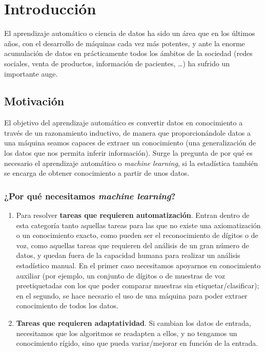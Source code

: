 \chapter{Introducción}
 El aprendizaje automático o ciencia de datos ha sido un área que en los últimos años, con el desarrollo de máquinas cada vez
 más potentes, y ante la enorme acumulación de datos en prácticamente todos los ámbitos de la sociedad (redes sociales, venta de
 productos, información de pacientes, \ldots) ha sufrido un importante auge.

 \section{Motivación}
 El objetivo del aprendizaje automático es convertir datos en conocimiento a través de un razonamiento inductivo, de manera que
 proporcionándole datos a una máquina seamos capaces de extraer un conocimiento (una generalización de los datos que nos permita
 inferir información). Surge la pregunta de por qué es necesario el aprendizaje automático o \textit{machine learning}, si la
 estadística también se encarga de obtener conocimiento a partir de unos datos.

 \subsection{¿Por qué necesitamos \textit{machine learning}?}
 \begin{enumerate}[i]
  \item Para resolver \textbf{tareas que requieren automatización}. Entran dentro de esta categoría tanto aquellas tareas para
  las que no existe una axiomatización o un conocimiento exacto, como pueden ser el reconocimiento de dígitos o de voz, como 
  aquellas tareas que requieren del análisis de un gran número de datos, y quedan fuera de la capacidad humana para realizar
  un análisis estadístico manual. En el primer caso necesitamos apoyarnos en conocimiento auxiliar (por ejemplo, 
  un conjunto de dígitos o de muestras de voz preetiquetadas con los que poder comparar muestras sin etiquetar/clasificar); 
  en el segundo, se hace necsario el uso de una máquina para poder extraer conocimiento de todos los datos.
  
  \item \textbf{Tareas que requieren adaptatividad}. Si cambian los datos de entrada, necesitamos que los algoritmos se readapten
  a ellos, y no tengamos un conocimiento rígido, sino que pueda variar/mejorar en función de la entrada.
 \end{enumerate}


